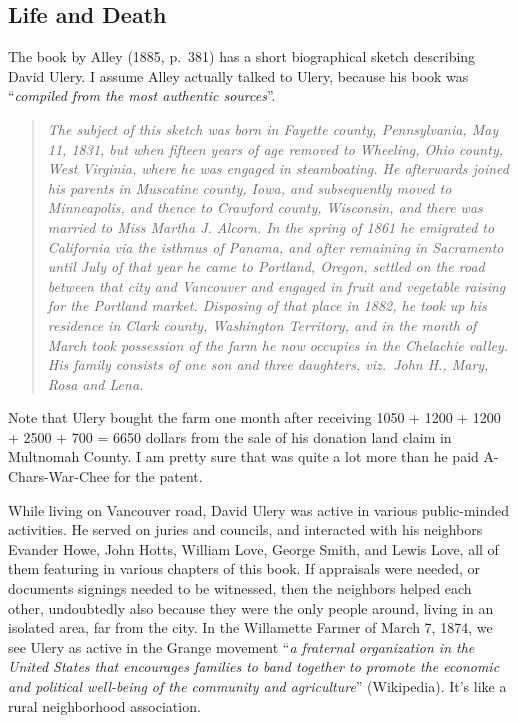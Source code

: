 \documentclass[
  12pt,
]{book}
\begin{document}
\hypertarget{life-and-death}{%
\subsection{Life and Death}\label{life-and-death}}

The book by Alley (1885, p.~381) has a short biographical sketch describing David Ulery. I assume Alley actually talked to Ulery, because his book was ``\emph{compiled from the most authentic sources}''.

\begin{quote}
\emph{The subject of this sketch was born in Fayette county, Pennsylvania, May 11, 1831, but when fifteen years of age removed to Wheeling, Ohio county, West Virginia, where he was engaged in steamboating. He afterwards joined his parents in Muscatine county, Iowa, and subsequently moved to Minneapolis, and thence to Crawford county, Wisconsin, and there was married to Miss Martha J. Alcorn. In the spring of 1861 he emigrated to California via the isthmus of Panama, and after remaining in Sacramento until July of that year he came to Portland, Oregon, settled on the road between that city and Vancouver and engaged in fruit and vegetable raising for the Portland market. Disposing of that place in 1882, he took up his residence in Clark county, Washington Territory, and in the month of March took possession of the farm he now occupies in the Chelachie valley. His family consists of one son and three daughters, viz.~John H., Mary, Rosa and Lena.}
\end{quote}

Note that Ulery bought the farm one month after receiving 1050 + 1200 + 1200 + 2500 + 700 = 6650 dollars from the sale of his donation land claim in Multnomah County. I am pretty sure that was quite a lot more than he paid A-Chars-War-Chee for the patent.

While living on Vancouver road, David Ulery was active in various public-minded activities. He served on juries and councils, and interacted with his neighbors Evander Howe, John Hotts, William Love, George Smith, and Lewis Love, all of them featuring in various chapters of this book. If appraisals were needed, or documents signings needed to be witnessed, then the neighbors helped each other, undoubtedly also because they were the only people around, living in an isolated area, far from the city. In the Willamette Farmer of March 7, 1874, we see Ulery as active in the Grange movement ``\emph{a fraternal organization in the United States that encourages families to band together to promote the economic and political well-being of the community and agriculture}'' (Wikipedia). It's like a rural neighborhood association.
\end{document}
